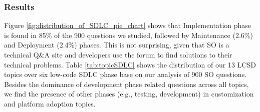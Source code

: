 \subsubsection{Results} Figure \ref{fig:distribution_of_SDLC_pie_chart} shows that Implementation phase is found in 85\% of the 900 questions we studied, followed by Maintenance (2.6\%) and Deployment (2.4\%) phases. This is not surprising, given that SO is a technical Q\&A site and developers use the forum to find solutions to their technical problems. Table \ref{tab:topicSDLC} shows the distribution of our 13 LCSD topics over six low-code SDLC phase base on our analysis of 900 SO questions. Besides the dominance of development phase related questions across all topics, we find the presence of other phases (e.g., testing, development) in customization and platform adoption topics. 




